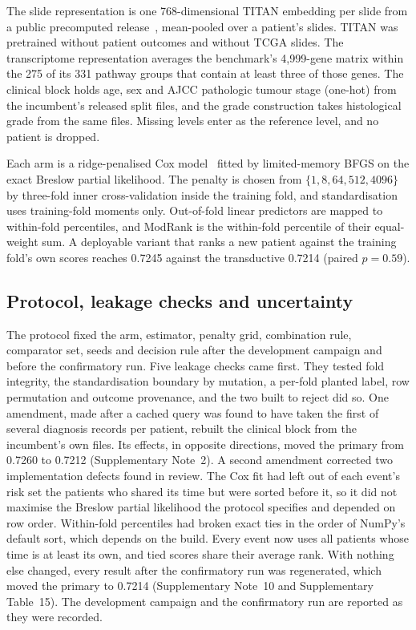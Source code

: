 \documentclass[pdflatex,sn-nature]{sn-jnl}
\begin{document}
The slide representation is one 768-dimensional TITAN embedding per slide from a public precomputed
release~\citep{ding2025titan}, mean-pooled over a patient's slides. TITAN was pretrained without
patient outcomes and without TCGA slides. The transcriptome representation averages the benchmark's
4,999-gene matrix within the 275 of its 331 pathway groups that contain at least three of those genes.
The clinical block holds age, sex and AJCC pathologic tumour stage (one-hot) from the incumbent's
released split files, and the grade construction takes histological grade from the same files.
Missing levels enter as the reference level, and no patient is dropped.

Each arm is a ridge-penalised Cox model~\citep{cox1972regression, simon2011regularization} fitted by
limited-memory BFGS on the exact Breslow partial likelihood. The penalty is chosen from $\{1, 8, 64, 512, 4096\}$
by three-fold inner cross-validation inside the training fold, and standardisation uses
training-fold moments only. Out-of-fold linear predictors are mapped to within-fold percentiles, and
ModRank is the within-fold percentile of their equal-weight sum. A deployable variant that ranks a
new patient against the training fold's own scores reaches 0.7245 against the transductive 0.7214
(paired $p=0.59$).

\subsection*{Protocol, leakage checks and uncertainty}

The protocol fixed the arm, estimator, penalty grid, combination rule, comparator set, seeds and
decision rule after the development campaign and before the confirmatory run. Five leakage checks
came first. They tested fold integrity, the standardisation boundary by mutation, a per-fold planted
label, row permutation and outcome provenance, and the two built to reject did so. One amendment,
made after a cached query was found to have taken the first of several diagnosis records per patient,
rebuilt the clinical block from the incumbent's own files. Its effects, in opposite directions, moved
the primary from 0.7260 to 0.7212 (Supplementary Note~2). A second amendment corrected two
implementation defects found in review. The Cox fit had left out of each event's risk set the
patients who shared its time but were sorted before it, so it did not maximise the Breslow partial
likelihood the protocol specifies and depended on row order. Within-fold percentiles had broken
exact ties in the order of NumPy's default sort, which depends on the build. Every event now uses all
patients whose time is at least its own, and tied scores share their average rank. With nothing else
changed, every result after the confirmatory run was regenerated, which moved the primary to 0.7214
(Supplementary Note~10 and Supplementary Table~15). The development campaign and the confirmatory run
are reported as they were recorded.
\end{document}
